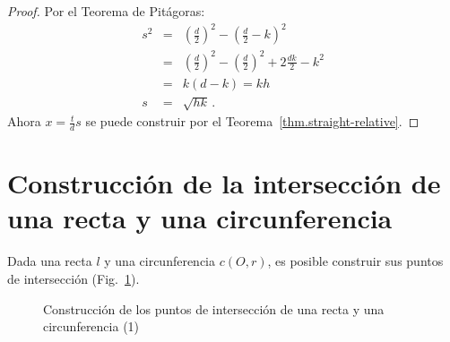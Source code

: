 \begin{proof}
Por el Teorema de Pitágoras:
\begin{eqnarray*}
s^2&=& \left(\frac{d}{2}\right)^2 - \left(\frac{d}{2}-k\right)^2\\
&=& \left(\frac{d}{2}\right)^2 - \left(\frac{d}{2}\right)^2 + 2\frac{dk}{2} - k^2\\
&=& k(d-k) = kh\\
s&=&\sqrt{hk}\,.
\end{eqnarray*}%
Ahora $x=\displaystyle\frac{t}{d}s$ se puede construir por el Teorema~\ref{thm.straight-relative}.
\end{proof}

\section{Construcción de la intersección de una recta y una circunferencia}\label{s.line-circle-straight}

\begin{theorem}
Dada una recta $l$ y una circunferencia $c(O,r)$, es posible construir sus puntos de intersección (Fig.~\ref{f.se-line-circle1}).
\end{theorem}
\begin{figure}%
\begin{center}
\end{center}
\caption{Construcción de los puntos de intersección de una recta y una circunferencia (1)}\label{f.se-line-circle1}
\end{figure}

